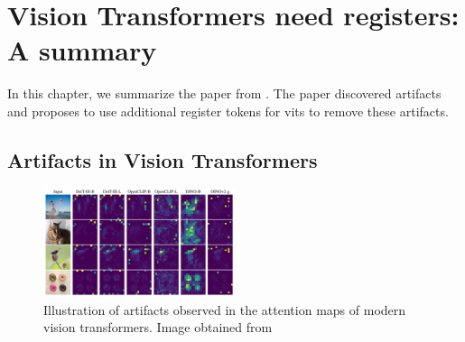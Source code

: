 \documentclass[conference]{IEEEtran}
\begin{document}
  \section{Vision Transformers need registers: A summary}
  \label{sec:registers}

  In this chapter, we summarize the paper from \citeauthor{registers} \cite{registers}. The paper discovered artifacts and proposes to use additional register tokens for \acp{vit} to remove these artifacts.

  \subsection{Artifacts in Vision Transformers}
  \label{sec:registers:artifacts}

  \begin{figure}
    \centering
    \includegraphics[width=0.5\textwidth]{figures/vits-artifacts.png}
    \caption{Illustration of artifacts observed in the attention maps of modern vision transformers. Image obtained from \cite{registers}}
    \label{fig:artifacts-observations}
  \end{figure}
\end{document}
